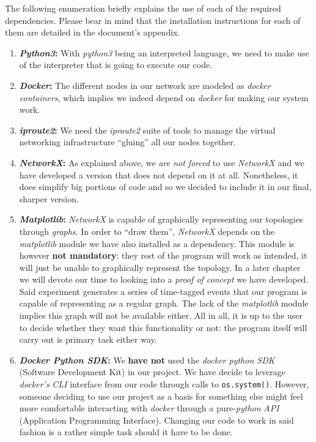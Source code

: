             The following enumeration briefly explains the use of each of the required dependencies. Please bear in mind that the installation instructions for each of them are detailed in the document's appendix.\\

            \begin{enumerate}
                \item \textbf{\textit{Python3}:} With \textit{python3} being an interpreted language, we need to make use of the interpreter that is going to execute our code.
                \item \textbf{\textit{Docker}:} The different nodes in our network are modeled as \textit{docker containers}, which implies we indeed depend on \textit{docker} for making our system work.
                \item \textbf{\textit{iproute2}:} We need the \textit{iproute2} suite of tools to manage the virtual networking infrastructure ``gluing'' all our nodes together.
                \item \textbf{\textit{NetworkX}:} As explained above, we \textit{are not forced} to use \textit{NetworkX} and we have developed a version that does not depend on it at all. Nonetheless, it does simplify big portions of code and so we decided to include it in our final, sharper version.
                \item \textbf{\textit{Matplotlib}:} \textit{NetworkX} is capable of graphically representing our topologies through \textit{graphs}. In order to ``draw them'', \textit{NetworkX} depends on the \textit{matplotlib} module we have also installed as a dependency. This module is however \textbf{not mandatory}: they rest of the program will work as intended, it will just be unable to graphically represent the topology. In a later chapter we will devote our time to looking into a \textit{proof of concept} we have developed. Said experiment generates a series of time-tagged events that our program is capable of representing as a regular graph. The lack of the \textit{matplotlib} module implies this graph will not be available either. All in all, it is up to the user to decide whether they want this functionality or not: the program itself will carry out is primary task either way.
                \item \textbf{\textit{Docker Python SDK}:} We \textbf{have not} used the \textit{docker python SDK} (Software Development Kit) in our project. We have decide to leverage \textit{docker's} \textit{CLI} interface from our code through calls to \texttt{os.system()}. However, someone deciding to use our project as a basis for something else might feel more comfortable interacting with \textit{docker} through a pure-\textit{python} \textit{API} (Application Programming Interface). Changing our code to work in said fashion is a rather simple task should it have to be done.
            \end{enumerate}

